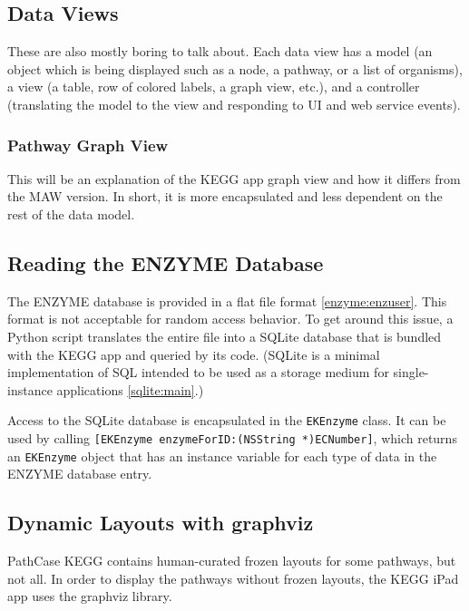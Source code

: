 \subsection{Data Views}
\label{sect:kegg_impl_data_views}

These are also mostly boring to talk about. Each data view has a model (an
object which is being displayed such as a node, a pathway, or a list of
organisms), a view (a table, row of colored labels, a graph view, etc.), and a
controller (translating the model to the view and responding to UI and web
service events).

\subsubsection{Pathway Graph View}
\label{sect:kegg_impl_graph_view}

This will be an explanation of the KEGG app graph view and how it differs from
the MAW version. In short, it is more encapsulated and less dependent on the
rest of the data model.

\subsection{Reading the ENZYME Database}
\label{sect:kegg_impl_enzyme}

The ENZYME database is provided in a flat file format \ref{enzyme:enzuser}. This
format is not acceptable for random access behavior. To get around this issue, a
Python script translates the entire file into a SQLite database that is bundled
with the KEGG app and queried by its code. (SQLite is a minimal implementation
of SQL intended to be used as a storage medium for single-instance applications
\ref{sqlite:main}.)

Access to the SQLite database is encapsulated in the \texttt{EKEnzyme} class. It
can be used by calling \texttt{[EKEnzyme enzymeForID:(NSString *)ECNumber]},
which returns an \texttt{EKEnzyme} object that has an instance variable for each
type of data in the ENZYME database entry.

\subsection{Dynamic Layouts with graphviz}
\label{sect:kegg_impl_graphviz}

PathCase KEGG contains human-curated frozen layouts for some pathways, but not
all. In order to display the pathways without frozen layouts, the KEGG iPad app
uses the graphviz library.


